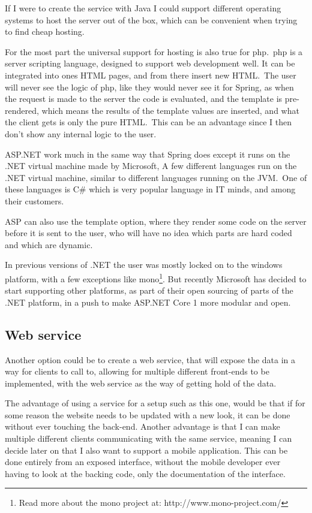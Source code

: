 If I were to create the service with Java I could support different operating systems to host the server out of the box, which can be convenient when trying to find cheap hosting.

For the most part the universal support for hosting is also true for php.\ php is
a server scripting language\cite{php-home}, designed to support web development
well. It can be integrated into ones HTML pages, and from there insert new HTML.\
The user will never see the logic of php, like they would never see it for
Spring, as when the request is made to the server the code is evaluated, and the
template is pre-rendered, which means the results of the template values are
inserted, and what the client gets is only the pure HTML.\ This can be an
advantage since I then don't show any internal logic to the user. 

ASP.NET work much in the same way that Spring does except it runs on the .NET
virtual machine made by Microsoft, A few different languages run on the .NET
virtual machine, similar to different languages running on the JVM.\ One of these
languages is C\# which is very popular language in IT minds, and among their
customers. 

ASP can also use the template option, where they render some code on the server
before it is sent to the user, who will have no idea which parts are hard coded
and which are dynamic. 

In previous versions of .NET the user was mostly locked on to the windows
platform, with a few exceptions like mono\footnote{Read more about the mono
  project at: http://www.mono-project.com/}. But recently Microsoft has decided
to start supporting other platforms, as part of their open sourcing of parts of
the .NET platform\cite{.net-core}, in a push to make ASP.NET Core 1 more modular
and open. 

\subsection{Web service}
\label{sub:web_service}
Another option could be to create a web service, that will expose the data
in a way for clients to call to, allowing for multiple different front-ends to be
implemented, with the web service as the way of getting hold of the data. 

The advantage of using a service for a setup such as this one, would be that if
for some reason the website needs to be updated with a new look, it can be
done without ever touching the back-end. Another advantage is that I can make
multiple different clients communicating with the same service, meaning I can
decide later on that I also want to support a mobile application. This can be
done entirely from an exposed interface, without the mobile developer ever
having to look at the backing code, only the documentation of the interface. 

